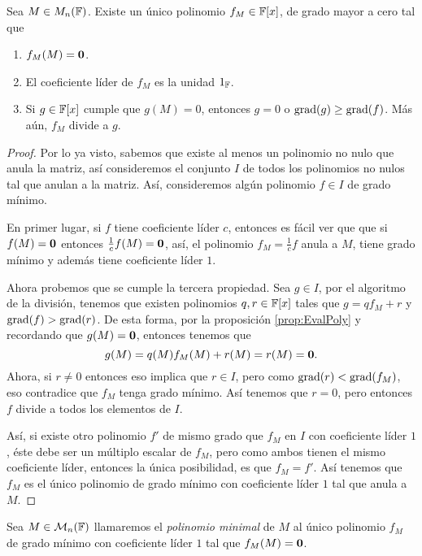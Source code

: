 \begin{teor}\label{teor:UnicidadPMin}
  Sea $M \in M_n(\mathbb{F})$. Existe un único polinomio $f_M \in \mathbb{F}[x]$, de grado mayor a cero tal que
  \begin{enumerate}
    \item $f_M(M) = \mathbf{0}$.
    \item El coeficiente líder de $f_M$ es la unidad $1_{\mathbb{F}}$.
    \item Si $g \in \mathbb{F}[x]$ cumple que $g(M) = 0$, entonces $g = 0$ o $\operatorname{grad}(g) \geq \operatorname{grad}(f)$. Más aún, $f_M$ divide a $g$.
  \end{enumerate}
\end{teor}
\begin{proof}
  Por lo ya visto, sabemos que existe al menos un polinomio no nulo que anula la matriz, así consideremos el conjunto $I$ de todos los polinomios no nulos tal que anulan a la matriz. Así, consideremos algún polinomio $f \in I$ de grado mínimo.

  En primer lugar, si $f$ tiene coeficiente líder $c$, entonces es fácil ver que que si $f(M) = \mathbf{0}$ entonces $\frac{1}{c} f (M) = \mathbf{0}$, así, el polinomio $f_M = \frac{1}{c} f$ anula a $M$, tiene grado mínimo y además tiene coeficiente líder $1$.

  Ahora probemos que se cumple la tercera propiedad. Sea $g \in I$, por el algoritmo de la división, tenemos que existen polinomios $q,r \in \mathbb{F}[x]$ tales que $g = qf_M+r$ y $\operatorname{grad}(f) > \operatorname{grad}(r)$. De esta forma, por la proposición \ref{prop:EvalPoly} y recordando que $g(M) = \mathbf{0}$, entonces tenemos que
  \[
    g(M) = q(M) f_M(M) + r(M) = r(M) = \mathbf{0}.
  \]
  Ahora, si $r \neq 0$ entonces eso implica que $r \in I$, pero como $\operatorname{grad}(r) < \operatorname{grad}(f_M)$, eso contradice que $f_M$ tenga grado mínimo. Así tenemos que $r = 0$, pero entonces $f$ divide a todos los elementos de $I$.
  
  Así, si existe otro polinomio $f'$ de mismo grado que $f_M$ en $I$ con coeficiente líder $1$, éste debe ser un múltiplo escalar de $f_M$, pero como ambos tienen el mismo coeficiente líder, entonces la única posibilidad, es que $f_M = f'$. Así tenemos que $f_M$ es el único polinomio de grado mínimo con coeficiente líder $1$ tal que anula a $M$.
\end{proof}

\begin{defi}
  Sea $M \in \mathcal{M}_n(\mathbb{F})$ llamaremos el \emph{polinomio minimal} de $M$ al único polinomio $f_M$ de grado mínimo con coeficiente líder $1$ tal que $f_M(M) = \mathbf{0}$.
\end{defi}

